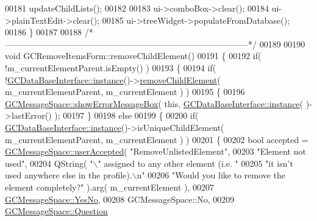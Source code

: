 \begin{DoxyCode}
{00181   updateChildLists();
00182 
00183   ui->comboBox->clear();
00184   ui->plainTextEdit->clear();
00185   ui->treeWidget->populateFromDatabase();
00186 \}
00187 
00188 \textcolor{comment}{/*
      --------------------------------------------------------------------------------------*/}
00189 
00190 \textcolor{keywordtype}{void} GCRemoveItemsForm::removeChildElement()
00191 \{
00192   \textcolor{keywordflow}{if}( !m\_currentElementParent.isEmpty() )
00193   \{
00194     \textcolor{keywordflow}{if}( !\hyperlink{class_g_c_data_base_interface_a1baea9c0667aa8b610ec30076fcab84c}{GCDataBaseInterface::instance}()->\hyperlink{class_g_c_data_base_interface_a657f2885b6741f8ac229939f77e7dd73}{removeChildElement}( 
      m\_currentElementParent, m\_currentElement ) )
00195     \{
00196       \hyperlink{namespace_g_c_message_space_ab118b3a133686167617eb955029fd44e}{GCMessageSpace::showErrorMessageBox}( \textcolor{keyword}{this}, \hyperlink{class_g_c_data_base_interface_a1baea9c0667aa8b610ec30076fcab84c}{GCDataBaseInterface::instance}(
      )->lastError() );
00197     \}
00198     \textcolor{keywordflow}{else}
00199     \{
00200       \textcolor{keywordflow}{if}( \hyperlink{class_g_c_data_base_interface_a1baea9c0667aa8b610ec30076fcab84c}{GCDataBaseInterface::instance}()->isUniqueChildElement( 
      m\_currentElementParent, m\_currentElement ) )
00201       \{
00202         \textcolor{keywordtype}{bool} accepted = \hyperlink{namespace_g_c_message_space_ae6f97d25f38a6b35c49e6e67ce4afaca}{GCMessageSpace::userAccepted}( \textcolor{stringliteral}{"RemoveUnlistedElement"},
00203                                                       \textcolor{stringliteral}{"Element not used"},
00204                                                       QString( \textcolor{stringliteral}{"\(\backslash\)"%
       assigned to any other element (i.e. "}
00205                                                                \textcolor{stringliteral}{"it isn't used
       anywhere else in the profile).\(\backslash\)n"}
00206                                                                \textcolor{stringliteral}{"Would you like
       to remove the element completely?"} ).arg( m\_currentElement ),
00207                                                       \hyperlink{namespace_g_c_message_space_ac1db082c29062fe6508ba03bf76bea44ab2defe87f3e886edf34f537f4ac8c282}{GCMessageSpace::YesNo},
00208                                                       GCMessageSpace::No,
00209                                                       \hyperlink{namespace_g_c_message_space_a67e94586e09cbc305257fbcdd7b686e2ae66d6709c87ccb0832b1456e2b4ad895}{GCMessageSpace::Question} 
}
\end{DoxyCode}
